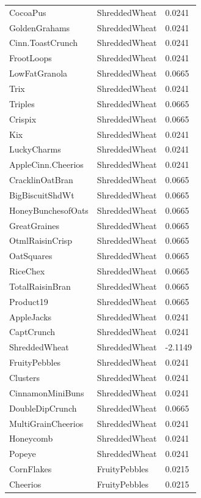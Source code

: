 \begin{table}[!htbp]
\begin{tabular}{lll}
\\
CocoaPus & ShreddedWheat & 0.0241
\\
GoldenGrahams & ShreddedWheat & 0.0241
\\
Cinn.ToastCrunch & ShreddedWheat & 0.0241
\\
FrootLoops & ShreddedWheat & 0.0241
\\
LowFatGranola & ShreddedWheat & 0.0665
\\
Trix & ShreddedWheat & 0.0241
\\
Triples & ShreddedWheat & 0.0665
\\
Crispix & ShreddedWheat & 0.0665
\\
Kix & ShreddedWheat & 0.0241
\\
LuckyCharms & ShreddedWheat & 0.0241
\\
AppleCinn.Cheerios & ShreddedWheat & 0.0241
\\
CracklinOatBran & ShreddedWheat & 0.0665
\\
BigBiscuitShdWt & ShreddedWheat & 0.0665
\\
HoneyBunchesofOats & ShreddedWheat & 0.0665
\\
GreatGraines & ShreddedWheat & 0.0665
\\
OtmlRaisinCrisp & ShreddedWheat & 0.0665
\\
OatSquares & ShreddedWheat & 0.0665
\\
RiceChex & ShreddedWheat & 0.0665
\\
TotalRaisinBran & ShreddedWheat & 0.0665
\\
Product19 & ShreddedWheat & 0.0665
\\
AppleJacks & ShreddedWheat & 0.0241
\\
CaptCrunch & ShreddedWheat & 0.0241
\\
ShreddedWheat & ShreddedWheat & -2.1149
\\
FruityPebbles & ShreddedWheat & 0.0241
\\
Clusters & ShreddedWheat & 0.0241
\\
CinnamonMiniBuns & ShreddedWheat & 0.0241
\\
DoubleDipCrunch & ShreddedWheat & 0.0665
\\
MultiGrainCheerios & ShreddedWheat & 0.0241
\\
Honeycomb & ShreddedWheat & 0.0241
\\
Popeye & ShreddedWheat & 0.0241
\\
CornFlakes & FruityPebbles & 0.0215
\\
Cheerios & FruityPebbles & 0.0215
\\

\end{tabular}
\end{table}
